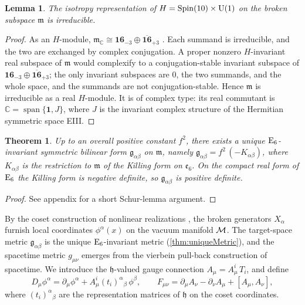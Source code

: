 \documentclass[pdflatex,sn-mathphys-num]{sn-jnl}
\theoremstyle{thmstyleone}
\newtheorem{theorem}{Theorem}
\newtheorem{lemma}[lemma]{Lemma}
\theoremstyle{thmstylethree}%
\theoremstyle{thmstyletwo}%
\begin{document}
\begin{lemma}\label{lem:Irrep}
The isotropy representation of
$H = \operatorname{Spin}(10) \times \mathrm{U(1)}$ on the broken subspace
$\mathfrak m$ is irreducible.
\end{lemma}

\begin{proof}
As an $H$-module, $\mathfrak m_{\mathbb C}\cong
\mathbf{16}_{-3}\oplus\overline{\mathbf{16}}_{+3}$ \cite{Helgason:1978,Slansky:1981}.
Each summand is irreducible, and the two are exchanged by complex conjugation.
A proper nonzero $H$-invariant real subspace of $\mathfrak m$ would complexify
to a conjugation-stable invariant subspace of
$\mathbf{16}_{-3}\oplus\overline{\mathbf{16}}_{+3}$; the only invariant
subspaces are $0$, the two summands, and the whole space, and the summands are
not conjugation-stable. Hence $\mathfrak m$ is irreducible as a real
$H$-module. It is of complex type: its real commutant is
$\mathbb C=\operatorname{span}\{\mathbf 1,J\}$, where $J$ is the invariant
complex structure of the Hermitian symmetric space EIII.
\end{proof}

\begin{theorem}\label{thm:uniqueMetric}
Up to an overall positive constant $f^{2}$, there exists a unique
$\mathrm{E}_{6}$-invariant symmetric bilinear form $\mathfrak g_{\alpha\beta}$ on
$\mathfrak m$, namely
$\mathfrak g_{\alpha\beta} = f^{2}\,(-K_{\alpha\beta})$, where
$K_{\alpha\beta}$ is the restriction to $\mathfrak m$ of the Killing form on
$\mathfrak e_{6}$. On the compact real form of $\mathrm{E}_{6}$ the Killing form is
negative definite, so $\mathfrak g_{\alpha\beta}$ is positive definite.
\end{theorem}

\begin{proof}
See appendix for a short Schur-lemma argument.
\end{proof}

By the coset construction of nonlinear realizations \cite{CWZ69}, the
broken generators \(X_{\alpha}\) furnish local coordinates
\(\phi^{\alpha}(x)\) on the vacuum manifold
\(\mathcal{M}\).  The target-space metric
\(\mathfrak g_{\alpha\beta}\) is the unique \(\mathrm{E}_{6}\)-invariant metric
(\autoref{thm:uniqueMetric}), and the spacetime metric \(g_{\mu\nu}\)
emerges from the vierbein pull-back construction of spacetime.
We introduce the \(\mathfrak h\)-valued gauge connection
\(A_{\mu}=A_{\mu}^{i}\,T_{i}\), and define
\[
  D_{\mu}\phi^{\alpha}
    = \partial_{\mu}\phi^{\alpha}
      + A_{\mu}^{i}(t_{i})^{\alpha}{}_{\beta}\,\phi^{\beta},
  \qquad
  F_{\mu\nu}
    = \partial_{\mu}A_{\nu}
      - \partial_{\nu}A_{\mu}
      + [A_{\mu},A_{\nu}],
\]
where \((t_{i})^{\alpha}{}_{\beta}\) are the representation
matrices of \(\mathfrak h\) on the coset coordinates.
\end{document}
